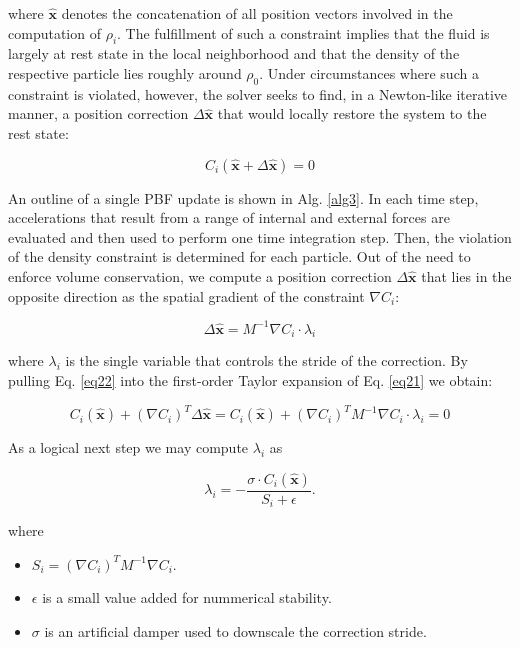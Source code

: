\documentclass[
	11pt, 
	DIV10,
	ngerman,
	a4paper, 
	oneside, 
	headings=normal, 
	captions=tableheading,
	final, 
	numbers=noenddot
]{scrartcl}
\begin{document}
where $ \hat{\boldsymbol{x}} $ denotes the concatenation of all position vectors involved in the computation of $ \rho_{i} $. The fulfillment of such a constraint implies that the fluid is largely at rest state in the local neighborhood and that the density of the respective particle lies roughly around $ \rho_{0} $. Under circumstances where such a constraint is violated, however, the solver seeks to find, in a Newton-like iterative manner, a position correction $ \Delta \hat{\boldsymbol{x}} $ that would locally restore the system to the rest state:

\begin{equation}
	\label{eq21}
	C_{i}(\hat{\boldsymbol{x}} + \Delta \hat{\boldsymbol{x}}) = 0
\end{equation}

An outline of a single PBF update is shown in Alg. \ref{alg3}. In each time step, accelerations that result from a range of internal and external forces are evaluated and then used to perform one time integration step. Then, the violation of the density constraint is determined for each particle. Out of the need to enforce volume conservation, we compute a position correction $ \Delta \hat{\boldsymbol{x}} $ that lies in the opposite direction as the spatial gradient of the constraint $ \nabla C_{i} $:

\begin{equation}
	\label{eq22}
	\Delta \hat{\boldsymbol{x}} = M^{-1} \nabla C_{i} \cdot \lambda_{i}
\end{equation}

where $ \lambda_{i} $ is the single variable that controls the stride of the correction. By pulling Eq. \eqref{eq22} into the first-order Taylor expansion of Eq. \eqref{eq21} we obtain:

\begin{equation}
	\label{eq23}
	C_{i}(\hat{\boldsymbol{x}}) + (\nabla C_{i})^{T} \Delta \hat{\boldsymbol{x}} = C_{i}(\hat{\boldsymbol{x}}) + (\nabla C_{i})^{T} M^{-1} \nabla C_{i} \cdot \lambda_{i} = 0
\end{equation}

As a logical next step we may compute $ \lambda_{i} $ as

\begin{equation}
	\label{eq24}
	\lambda_{i} = - \frac{\sigma \cdot C_{i}(\hat{\boldsymbol{x}})}{S_{i} + \epsilon}.
\end{equation}

where

\begin{itemize}
    \item $ S_{i} = (\nabla C_{i})^{T} M^{-1} \nabla C_{i} $.
    \item $ \epsilon $ is a small value added for nummerical stability.
    \item $ \sigma $ is an artificial damper used to downscale the correction stride.
\end{itemize}
\end{document}
